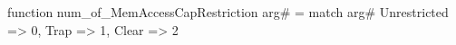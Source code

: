 function num_of_MemAccessCapRestriction arg# = match arg# {
  Unrestricted => 0,
  Trap => 1,
  Clear => 2
}
